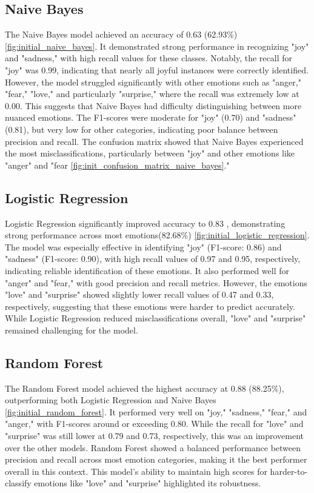 \clearpage

\subsection{Naive Bayes}
The Naive Bayes model achieved an accuracy of 0.63 (62.93\%) \ref{fig:initial_naive_bayes}. It demonstrated strong performance in recognizing "joy" and "sadness," with high recall values for these classes. Notably, the recall for "joy" was 0.99, indicating that nearly all joyful instances were correctly identified. However, the model struggled significantly with other emotions such as "anger," "fear," "love," and particularly "surprise," where the recall was extremely low at 0.00. This suggests that Naive Bayes had difficulty distinguishing between more nuanced emotions. The F1-scores were moderate for "joy" (0.70) and "sadness" (0.81), but very low for other categories, indicating poor balance between precision and recall. The confusion matrix showed that Naive Bayes experienced the most misclassifications, particularly between "joy" and other emotions like "anger" and "fear \ref{fig:init_confusion_matrix_naive_bayes}."

\subsection{Logistic Regression}
Logistic Regression significantly improved accuracy to 0.83 , demonstrating strong performance across most emotions(82.68\%) \ref{fig:initial_logistic_regression}. The model was especially effective in identifying "joy" (F1-score: 0.86) and "sadness" (F1-score: 0.90), with high recall values of 0.97 and 0.95, respectively, indicating reliable identification of these emotions. It also performed well for "anger" and "fear," with good precision and recall metrics. However, the emotions "love" and "surprise" showed slightly lower recall values of 0.47 and 0.33, respectively, suggesting that these emotions were harder to predict accurately. While Logistic Regression reduced misclassifications overall, "love" and "surprise" remained challenging for the model.

\subsection{Random Forest}
The Random Forest model achieved the highest accuracy at 0.88 (88.25\%), outperforming both Logistic Regression and Naive Bayes \ref{fig:initial_random_forest}. It performed very well on "joy," "sadness," "fear," and "anger," with F1-scores around or exceeding 0.80. While the recall for "love" and "surprise" was still lower at 0.79 and 0.73, respectively, this was an improvement over the other models. Random Forest showed a balanced performance between precision and recall across most emotion categories, making it the best performer overall in this context. This model's ability to maintain high scores for harder-to-classify emotions like "love" and "surprise" highlighted its robustness.

